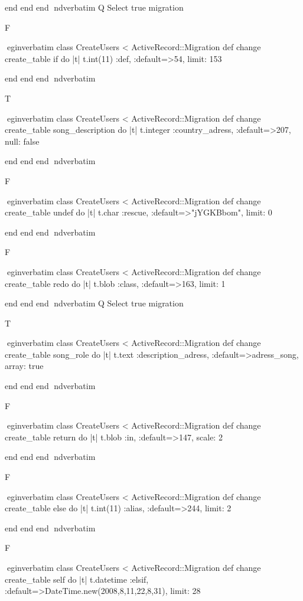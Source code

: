     end 
  end 
end
nd{verbatim}
Q
 Select true migration

F

egin{verbatim}
 class CreateUsers < ActiveRecord::Migration 
  def change 
    create_table if do |t| 
      t.int(11) :def, :default=>54, limit: 153
    
    end 
  end 
end
nd{verbatim}

T

egin{verbatim}
 class CreateUsers < ActiveRecord::Migration 
  def change 
    create_table song_description do |t| 
      t.integer :country_adress, :default=>207, null: false
    
    end 
  end 
end
nd{verbatim}

F

egin{verbatim}
 class CreateUsers < ActiveRecord::Migration 
  def change 
    create_table undef do |t| 
      t.char :rescue, :default=>"jYGKBbom", limit: 0
    
    end 
  end 
end
nd{verbatim}

F

egin{verbatim}
 class CreateUsers < ActiveRecord::Migration 
  def change 
    create_table redo do |t| 
      t.blob :class, :default=>163, limit: 1
    
    end 
  end 
end
nd{verbatim}
Q
 Select true migration

T

egin{verbatim}
 class CreateUsers < ActiveRecord::Migration 
  def change 
    create_table song_role do |t| 
      t.text :description_adress, :default=>adress_song, array: true
    
    end 
  end 
end
nd{verbatim}

F

egin{verbatim}
 class CreateUsers < ActiveRecord::Migration 
  def change 
    create_table return do |t| 
      t.blob :in, :default=>147, scale: 2
    
    end 
  end 
end
nd{verbatim}

F

egin{verbatim}
 class CreateUsers < ActiveRecord::Migration 
  def change 
    create_table else do |t| 
      t.int(11) :alias, :default=>244, limit: 2
    
    end 
  end 
end
nd{verbatim}

F

egin{verbatim}
 class CreateUsers < ActiveRecord::Migration 
  def change 
    create_table self do |t| 
      t.datetime :elsif, :default=>DateTime.new(2008,8,11,22,8,31), limit: 28
    
